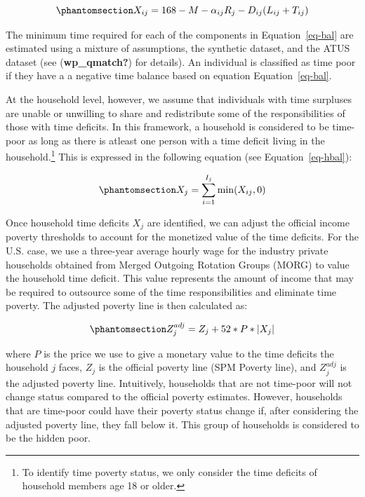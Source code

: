\documentclass[
  11pt,
]{article}
\begin{document}
\begin{equation}\phantomsection\label{eq-bal}{X_{ij} = 168 - M - \alpha_{ij}R_j-D_{ij}(L_{ij}+T_{ij})
}\end{equation}

The minimum time required for each of the components in
Equation~\ref{eq-bal} are estimated using a mixture of assumptions, the
synthetic dataset, and the ATUS dataset (see (\textbf{wp\_qmatch?}) for
details). An individual is classified as time poor if they have a a
negative time balance based on equation Equation~\ref{eq-bal}.

At the household level, however, we assume that individuals with time
surpluses are unable or unwilling to share and redistribute some of the
responsibilities of those with time deficits. In this framework, a
household is considered to be time-poor as long as there is atleast one
person with a time deficit living in the household.\footnote{To identify
  time poverty status, we only consider the time deficits of household
  members age 18 or older.} This is expressed in the following equation
(see Equation~\ref{eq-hbal}):

\begin{equation}\phantomsection\label{eq-hbal}{X_{j} = \sum_{i=1}^{I_j} \min(X_{ij},0)
}\end{equation}

Once household time deficits \(X_{j}\) are identified, we can adjust the
official income poverty thresholds to account for the monetized value of
the time deficits. For the U.S. case, we use a three-year average hourly
wage for the industry private households obtained from Merged Outgoing
Rotation Groups (MORG) to value the household time deficit. This value
represents the amount of income that may be required to outsource some
of the time responsibilities and eliminate time poverty. The adjusted
poverty line is then calculated as:

\begin{equation}\phantomsection\label{eq-limtip}{Z_{j}^{adj} = Z_{j} + 52*P* |X_{j}|
}\end{equation}

where \(P\) is the price we use to give a monetary value to the time
deficits the household \({j}\) faces, \(Z_{j}\) is the official poverty
line (SPM Poverty line), and \(Z_{j}^{adj}\) is the adjusted poverty
line. Intuitively, households that are not time-poor will not change
status compared to the official poverty estimates. However, households
that are time-poor could have their poverty status change if, after
considering the adjusted poverty line, they fall below it. This group of
households is considered to be the hidden poor.
\end{document}
